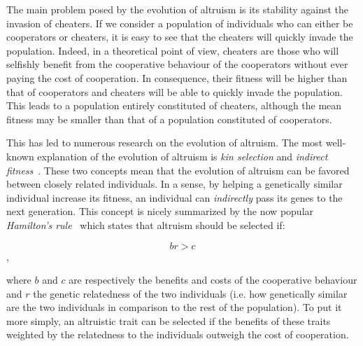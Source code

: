     The main problem posed by the evolution of altruism is its stability against the invasion of cheaters. If we consider a population of individuals who can either be cooperators or cheaters, it is easy to see that the cheaters will quickly invade the population. Indeed, in a theoretical point of view, cheaters are those who will selfishly benefit from the cooperative behaviour of the cooperators without ever paying the cost of cooperation. In consequence, their fitness will be higher than that of cooperators and cheaters will be able to quickly invade the population. This leads to a population entirely constituted of cheaters, although the mean fitness may be smaller than that of a population constituted of cooperators.

    This has led to numerous research on the evolution of altruism. The most well-known explanation of the evolution of altruism is \emph{kin selection} and \emph{indirect fitness}~\parencite{Hamilton1964}. These two concepts mean that the evolution of altruism can be favored between closely related individuals. In a sense, by helping a genetically similar individual increase its fitness, an individual can \emph{indirectly} pass its genes to the next generation. This concept is nicely summarized by the now popular \emph{Hamilton's rule}~\parencite{Hamilton1964} which states that altruism should be selected if:

    \[br > c\],

    where $b$ and $c$ are respectively the benefits and costs of the cooperative behaviour and $r$ the genetic relatedness of the two individuals (i.e. how genetically similar are the two individuals in comparison to the rest of the population). To put it more simply, an altruistic trait can be selected if the benefits of these traits weighted by the relatedness to the individuals outweigh the cost of cooperation.

